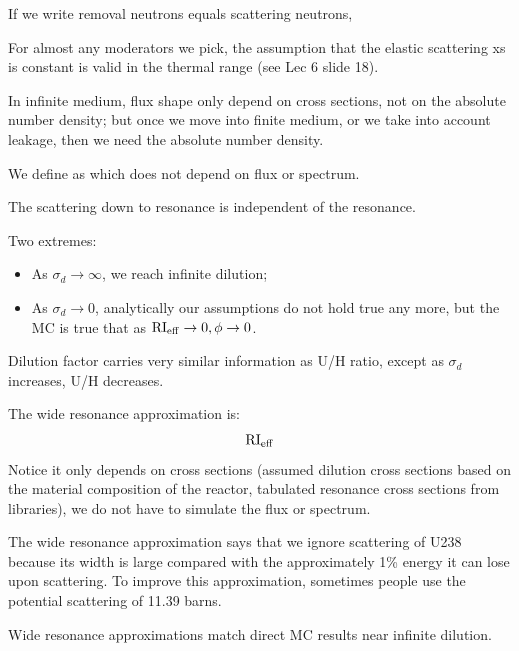 \documentclass{school-22.211-notes}
\date{February 29, 2012}
\begin{document}
\maketitle



If we write removal neutrons equals scattering neutrons, 


For almost any moderators we pick, the assumption that the elastic scattering xs is constant is valid in the thermal range (see Lec 6 slide 18). 

In infinite medium, flux shape only depend on cross sections, not on the absolute number density; but once we move into finite medium, or we take into account leakage, then we need the absolute number density. 

We define  as
which does not depend on flux or spectrum. 

The scattering down to resonance is independent of the resonance. 


Two extremes:
\begin{itemize}
\item As $\sigma_d \to \infty$, we reach infinite dilution;
\item As $\sigma_d \to 0$, analytically our assumptions do not hold true any more, but the MC is true that as $\mathrm{RI}_{\mathrm{eff}} \to 0, \phi \to 0$. 
\end{itemize}

Dilution factor carries very similar information as U/H ratio, except as $\sigma_d$ increases, U/H decreases. 


The wide resonance approximation is: 
\begin{align}
\mathrm{RI}_{\mathrm{eff}} 
\end{align}
Notice it only depends on cross sections (assumed dilution cross sections based on the material composition of the reactor, tabulated resonance cross sections from libraries), we do not have to simulate the flux or spectrum. 

The wide resonance approximation says that we ignore scattering of U238 because its width is large compared with the approximately 1\% energy it can lose upon scattering. To improve this approximation, sometimes people use the potential scattering of 11.39 barns. 


Wide resonance approximations match direct MC results near infinite dilution. 
\end{document}
